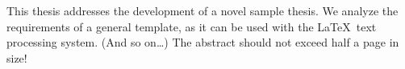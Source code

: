 This thesis addresses the development of a novel sample thesis. We analyze the requirements of a general template, as it can be used with the \LaTeX\ text processing system. (And so on\dots) The abstract should not exceed half a page in size!

